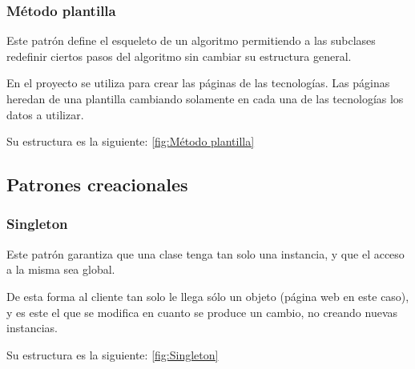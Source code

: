 
\subsubsection{Método plantilla}
Este patrón define el esqueleto de un algoritmo permitiendo a las subclases redefinir ciertos pasos del algoritmo sin cambiar su estructura general.

En el proyecto se utiliza para crear las páginas de las tecnologías. Las páginas heredan de una plantilla cambiando solamente en cada una de las tecnologías los datos a utilizar.

Su estructura es la siguiente: \ref{fig:Método plantilla}


\subsection{Patrones creacionales}
\subsubsection{Singleton}
Este patrón garantiza que una clase tenga tan solo una instancia, y que el acceso a la misma sea global. 

De esta forma al cliente tan solo le llega sólo un objeto (página web en este caso), y es este el que se modifica en cuanto se produce un cambio, no creando nuevas instancias.

Su estructura es la siguiente: \ref{fig:Singleton}

